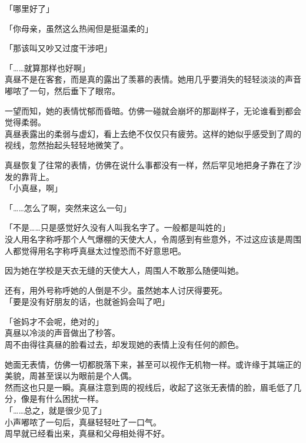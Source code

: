 「哪里好了」

「你母亲，虽然这么热闹但是挺温柔的」

「那该叫又吵又过度干涉吧」

「……就算那样也好啊」\\

真昼不是在客套，而是真的露出了羡慕的表情。她用几乎要消失的轻轻淡淡的声音嘟哝了一句，然后垂下了眼帘。

一望而知，她的表情忧郁而昏暗。仿佛一碰就会崩坏的那副样子，无论谁看到都会觉得柔弱。\\

真昼表露出的柔弱与虚幻，看上去绝不仅仅只有疲劳。这样的她似乎感受到了周的视线，忽然抬起头轻轻地微笑了。

真昼恢复了往常的表情，仿佛在说什么事都没有一样，然后罕见地把身子靠在了沙发的靠背上。\\

「小真昼，啊」

「……怎么了啊，突然来这么一句」

「不是……只是感觉好久没有人叫我名字了。一般都是叫姓的」\\

没人用名字称呼那个人气爆棚的天使大人，令周感到有些意外，不过这应该是周围人都觉得用名字称呼真昼太过惶恐而不好意思吧。

因为她在学校是天衣无缝的天使大人，周围人不敢那么随便叫她。

还有，用外号称呼她的人倒是不少。虽然她本人讨厌得要死。\\

「要是没有好朋友的话，也就爸妈会叫了吧」

「爸妈才不会呢，绝对的」\\

真昼以冷淡的声音做出了秒答。\\

周不由得往真昼的脸看过去，却发现她的表情上没有任何的颜色。

她面无表情，仿佛一切都脱落下来，甚至可以视作无机物一样。或许缘于其端正的美貌，周甚至误以为眼前是个人偶。\\

然而这也只是一瞬。真昼注意到周的视线后，收起了这张无表情的脸，眉毛低了几分，像是有什么困扰一样。\\

「……总之，就是很少见了」\\

小声嘟哝了一句后，真昼轻轻吐了一口气。\\

周早就已经看出来，真昼和父母相处得不好。\\

